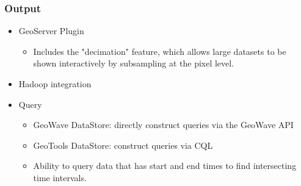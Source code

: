 \subsubsection*{Output}

\begin{itemize}
\item{
  GeoServer Plugin
  \begin{itemize}
  \item Includes the "decimation" feature, which allows large datasets to be shown interactively by subsampling at the pixel level.
  \end{itemize}
}
\item Hadoop integration
\item{
  Query
  \begin{itemize}
    \item GeoWave DataStore: directly construct queries via the GeoWave API
    \item GeoTools DataStore: construct queries via CQL
    \item Ability to query data that has start and end times to find intersecting time intervals.
  \end{itemize}
}
\end{itemize}
